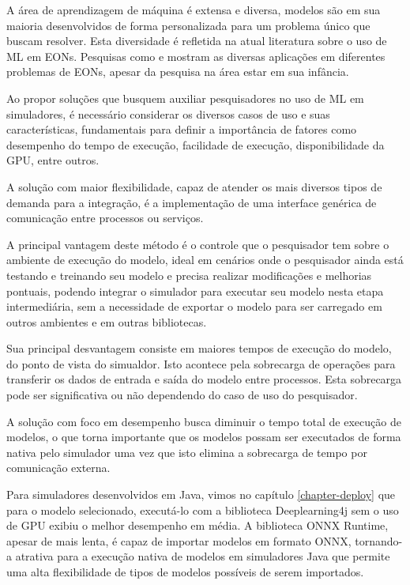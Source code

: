 A área de aprendizagem de máquina é extensa e diversa, modelos são em sua maioria desenvolvidos de forma personalizada para um problema único que buscam resolver. Esta diversidade é refletida na atual literatura sobre o uso de ML em EONs. Pesquisas como \cite{eon_ml_survey_2020} e \cite{8527529} mostram as diversas aplicações em diferentes problemas de EONs, apesar da pesquisa na área estar em sua infância.

Ao propor soluções que busquem auxiliar pesquisadores no uso de ML em simuladores, é necessário considerar os diversos casos de uso e suas características, fundamentais para definir a importância de fatores como desempenho do tempo de execução, facilidade de execução, disponibilidade da GPU, entre outros.

A solução com maior flexibilidade, capaz de atender os mais diversos tipos de demanda para a integração, é a implementação de uma interface genérica de comunicação entre processos ou serviços.

A principal vantagem deste método é o controle que o pesquisador tem sobre o ambiente de execução do modelo, ideal em cenários onde o pesquisador ainda está testando e treinando seu modelo e precisa realizar modificações e melhorias pontuais, podendo integrar o simulador para executar seu modelo nesta etapa intermediária, sem a necessidade de exportar o modelo para ser carregado em outros ambientes e em outras bibliotecas.

Sua principal desvantagem consiste em maiores tempos de execução do modelo, do ponto de vista do simualdor. Isto acontece pela sobrecarga de operações para transferir os dados de entrada e saída do modelo entre processos. Esta sobrecarga pode ser significativa ou não dependendo do caso de uso do pesquisador.

A solução com foco em desempenho busca diminuir o tempo total de execução de modelos, o que torna importante que os modelos possam ser executados de forma nativa pelo simulador uma vez que isto elimina a sobrecarga de tempo por comunicação externa.

Para simuladores desenvolvidos em Java, vimos no capítulo \ref{chapter-deploy} que para o modelo selecionado, executá-lo com a biblioteca Deeplearning4j sem o uso de GPU exibiu o melhor desempenho em média. A biblioteca ONNX Runtime, apesar de mais lenta, é capaz de importar modelos em formato ONNX, tornando-a atrativa para a execução nativa de modelos em simuladores Java que permite uma alta flexibilidade de tipos de modelos possíveis de serem importados.

